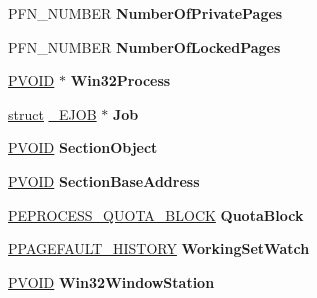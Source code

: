\begin{DoxyCompactItemize}
\item 
\mbox{\label{struct___e_p_r_o_c_e_s_s_a3a9c8e91e4e8843625a092859e4cfbfe}} 
P\+F\+N\+\_\+\+N\+U\+M\+B\+ER {\bfseries Number\+Of\+Private\+Pages}
\item 
\mbox{\label{struct___e_p_r_o_c_e_s_s_a964a2fa780f1d0681bf4642830b45fe1}} 
P\+F\+N\+\_\+\+N\+U\+M\+B\+ER {\bfseries Number\+Of\+Locked\+Pages}
\item 
\mbox{\label{struct___e_p_r_o_c_e_s_s_a87114da91b6a534190f2c80d650c2b95}} 
\hyperlink{interfacevoid}{P\+V\+O\+ID} $\ast$ {\bfseries Win32\+Process}
\item 
\mbox{\label{struct___e_p_r_o_c_e_s_s_a65ec0f7ca4ece8d17401e3ebfa7fe0dd}} 
\hyperlink{interfacestruct}{struct} \hyperlink{struct___e_j_o_b}{\+\_\+\+E\+J\+OB} $\ast$ {\bfseries Job}
\item 
\mbox{\label{struct___e_p_r_o_c_e_s_s_a0f7aae71872ed5e9908de38b9e9f78d9}} 
\hyperlink{interfacevoid}{P\+V\+O\+ID} {\bfseries Section\+Object}
\item 
\mbox{\label{struct___e_p_r_o_c_e_s_s_a99d40cc367876941b5865d139072dd2e}} 
\hyperlink{interfacevoid}{P\+V\+O\+ID} {\bfseries Section\+Base\+Address}
\item 
\mbox{\label{struct___e_p_r_o_c_e_s_s_a7e7b17d395356a376c5893109b164e87}} 
\hyperlink{struct___e_p_r_o_c_e_s_s___q_u_o_t_a___b_l_o_c_k}{P\+E\+P\+R\+O\+C\+E\+S\+S\+\_\+\+Q\+U\+O\+T\+A\+\_\+\+B\+L\+O\+CK} {\bfseries Quota\+Block}
\item 
\mbox{\label{struct___e_p_r_o_c_e_s_s_ac6fc4ed45c15a7858e0334a8868138d3}} 
\hyperlink{struct___p_a_g_e_f_a_u_l_t___h_i_s_t_o_r_y}{P\+P\+A\+G\+E\+F\+A\+U\+L\+T\+\_\+\+H\+I\+S\+T\+O\+RY} {\bfseries Working\+Set\+Watch}
\item 
\mbox{\label{struct___e_p_r_o_c_e_s_s_ab9109192571159b48d1c4c3f262223a8}} 
\hyperlink{interfacevoid}{P\+V\+O\+ID} {\bfseries Win32\+Window\+Station}
\item 

\end{DoxyCompactItemize}
